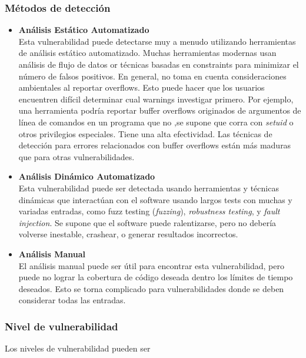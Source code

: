 \subsubsection{Métodos de detección}

\begin{itemize}
    \item \textbf{Análisis Estático Automatizado}\\
        Esta vulnerabilidad puede detectarse muy a menudo utilizando herramientas de análisis estático automatizado. Muchas herramientas modernas usan análisis de flujo de datos
        or técnicas basadas en constraints para minimizar el número de falsos positivos. En general, no toma en cuenta consideraciones ambientales al reportar overflows. Esto puede
        hacer que los usuarios encuentren difícil determinar cual warnings investigar primero. Por ejemplo, una herramienta podría reportar buffer overflows originados de argumentos
        de línea de comandos en un programa que no ,se supone que corra con \textit{setuid} o otros privilegios especiales. 
        Tiene una alta efectividad. Las técnicas de detección para errores relacionados con buffer overflows están más maduras que para otras vulnerabilidades.
    \item \textbf{Análisis Dinámico Automatizado}\\
        Esta vulnerabilidad puede ser detectada usando herramientas y técnicas dinámicas que interactúan con el software usando largos tests con muchas y variadas entradas, como 
        fuzz testing (\textit{fuzzing}), \textit{robustness testing}, y \textit{fault injection}. Se supone que el software puede ralentizarse, pero no debería volverse inestable, 
        crashear, o generar resultados incorrectos.
    \item \textbf{Análisis Manual}\\
        El análisis manual puede ser útil para encontrar esta vulnerabilidad, pero puede no lograr la cobertura de código deseada dentro los límites de tiempo deseados. Esto se torna
        complicado para vulnerabilidades donde se deben considerar todas las entradas.
\end{itemize}

\subsubsection{Nivel de vulnerabilidad}

Los niveles de vulnerabilidad pueden ser 


